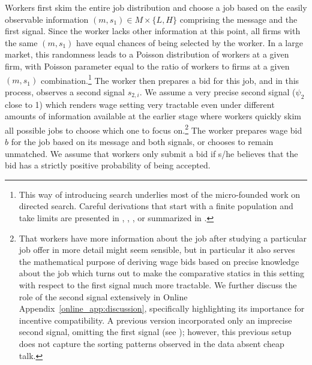 \documentclass[12pt]{article}
\begin{document}
Workers first skim the entire job distribution and choose a job based on the easily observable information $(m,s_{1})\in M\times \{L,H\}$ comprising the message and the first signal. Since the worker lacks other information at this point, all firms with the same $(m,s_{1})$ have equal chances of being selected by the worker. In a large market, this randomness
leads to a Poisson distribution of workers at a given firm, with Poisson
parameter equal to the ratio of workers to firms at a given $(m,s_{1})$
combination.\footnote{
This way of introducing search underlies most of the micro-founded work on directed search. Careful derivations that start with a finite population and take limits are presented in \cite{peters_1991}, \cite{peters_1997}, \cite{burdett_etal2001}, or summarized in \cite{wright_etal2021}.} The worker then prepares a bid for this job, and in this process, observes a second signal $s_{2,i}.$ We assume a very precise second signal ($\psi _{2}$ close to 1) which renders wage setting very tractable even under different amounts of information available at the earlier stage where workers quickly skim all possible jobs to choose which one to focus on.\footnote{That workers have more information about the job after studying a particular job offer in more detail might seem sensible, but in particular it also serves the mathematical purpose of deriving wage bids based on precise knowledge about the job which turns out to make the comparative statics in this setting with respect to the first signal much more tractable. We further discuss the role of the second signal extensively in Online Appendix~\ref{online_app:discussion}, specifically highlighting its importance for incentive compatibility. A previous version incorporated only an imprecise second signal, omitting the first signal (see \cite{horton2021sorting}); however, this previous setup does not capture the sorting patterns observed in the data absent cheap talk.} The worker prepares wage bid $b$ for the job based on its message and both signals, or chooses to remain unmatched. We assume that workers only submit
a bid if s/he believes that the bid has a strictly positive probability of being accepted.
\end{document}
